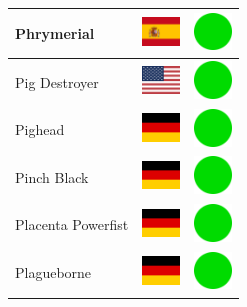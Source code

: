 \documentclass[12pt, a4paper, twoside]{report}
\begin{document}
\begin{center}
\begin{longtable}{|p{5cm}|p{2cm}|p{2cm}|}
 Phrymerial                                                 & \includegraphics[width=1cm]{../img/flags/es} &   \includegraphics[width=1cm]{../likes/y} \\ \hline
 Pig Destroyer                                              & \includegraphics[width=1cm]{../img/flags/us} &   \includegraphics[width=1cm]{../likes/y} \\ \hline
 Pighead                                                    & \includegraphics[width=1cm]{../img/flags/de} &   \includegraphics[width=1cm]{../likes/y} \\ \hline
 Pinch Black                                                & \includegraphics[width=1cm]{../img/flags/de} &   \includegraphics[width=1cm]{../likes/y} \\ \hline
 Placenta Powerfist                                         & \includegraphics[width=1cm]{../img/flags/de} &   \includegraphics[width=1cm]{../likes/y} \\ \hline
 Plagueborne                                                & \includegraphics[width=1cm]{../img/flags/de} &   \includegraphics[width=1cm]{../likes/y} \\ \hline

\end{longtable}
\end{center}
\end{document}
